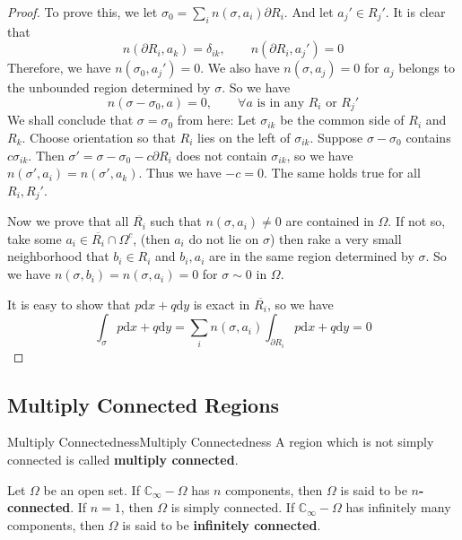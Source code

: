 \documentclass[../main.tex]{subfiles}
\begin{document}
\begin{proof}
To prove this, we let $\sigma_0=\sum_{i} n(\sigma,a_i) \partial R_i $. And let $a_j'\in R_j'$. It is clear that
\begin{equation*}
	n( \partial R_i, a_k) = \delta_{ik}, \qquad n(\partial R_i, a_j') = 0
\end{equation*}
Therefore, we have $n(\sigma_0,a_j')=0$. We also have $n(\sigma,a_j)=0$ for $a_j$ belongs to the unbounded region determined by $\sigma$. So we have
\begin{equation*}
	n(\sigma - \sigma_0, a) = 0, \qquad \forall a \text{ is in any } R_i \text{ or } R_j'
\end{equation*}
We shall conclude that $\sigma=\sigma_0$ from here: Let $\sigma_{ik}$ be the common side of $R_i$ and $R_k$. Choose orientation so that $R_i$ lies on the left of $\sigma_{ik}$. Suppose $\sigma-\sigma_0$ contains $c \sigma_{ik}$. Then $\sigma'=\sigma-\sigma_0-c \partial R_i$ does not contain $\sigma_{ik}$, so we have $n(\sigma',a_i) = n(\sigma',a_k)$. Thus we have $-c=0$. The same holds true for all $R_i, R_j'$.

Now we prove that all $\overline{R_i}$ such that $n(\sigma,a_i)\neq 0$ are contained in $\Omega$. If not so, take some $a_i\in \overline{R_i}\cap \Omega^c$, (then $a_i$ do not lie on $\sigma$) then rake a very small neighborhood that $b_i\in R_i$ and $b_i,a_i$ are in the same region determined by $\sigma$. So we have $n(\sigma,b_i)=n(\sigma,a_i)=0$ for $\sigma\sim 0$ in $\Omega$.

It is easy to show that $p \mathrm{d} x + q \mathrm{d} y$ is exact in $\overline{R_i}$, so we have
\begin{equation*}
	\int_{\sigma} p \mathrm{d} x + q \mathrm{d} y = \sum_{i} n(\sigma,a_i) \int_{\partial R_i} p \mathrm{d} x + q \mathrm{d} y = 0
\end{equation*}
\end{proof}

\subsection{Multiply Connected Regions}
\begin{definition}{Multiply Connectedness}{Multiply Connectedness}
	A region which is not simply connected is called \textbf{multiply connected}.

	Let $\Omega$ be an open set. If $\mathbb{C}_{\infty }-\Omega$ has $n$ components, then $\Omega$ is said to be \textbf{$n$-connected}. If $n=1$, then $\Omega$ is simply connected. If $\mathbb{C}_{\infty }-\Omega$ has infinitely many components, then $\Omega$ is said to be \textbf{infinitely connected}.
\end{definition}
\end{document}
